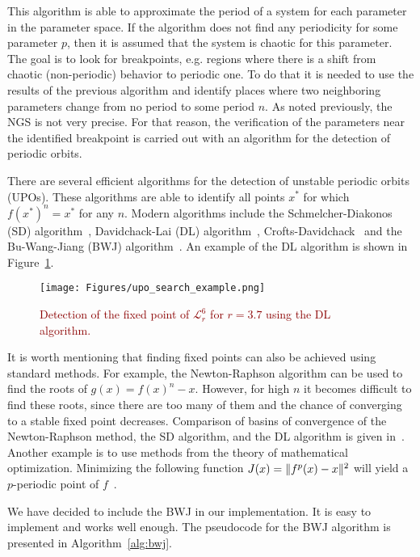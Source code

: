 This algorithm is able to approximate the period of a system for each parameter in the parameter space.
If the algorithm does not find any periodicity for some parameter $p$, then it is assumed that the system is chaotic for this parameter.
The goal is to look for breakpoints, e.g. regions where there is a shift from chaotic (non-periodic) behavior to periodic one.
To do that it is needed to use the results of the previous algorithm and identify places where two neighboring parameters change from no period to some period $n$.
As noted previously, the NGS is not very precise. For that reason, the verification of the parameters near the identified breakpoint is carried out with an algorithm for the detection of periodic orbits.
\par
There are several efficient algorithms for the detection of unstable periodic orbits (UPOs).
These algorithms are able to identify all points $x^{*}$ for which $f(x^{*})^{n}=x^{*}$ for any $n$.
Modern algorithms include the Schmelcher-Diakonos (SD) algorithm~\cite{Schmelcher1997,Pingel2000, Pingel2001}, Davidchack-Lai (DL) algorithm~\cite{Davidchack1999, Davidchack2001, Klebanoff2001}, Crofts-Davidchack~\cite{Crofts2005,Crofts2007,Crofts2008,Crofts20090901} and the Bu-Wang-Jiang (BWJ) algorithm~\cite{Bu2004}.
An example of the DL algorithm is shown in Figure~\ref{fig:upo_search_example}.

\begin{figure}[!h]
    \centering
    \texttt{[image: Figures/upo\_search\_example.png]}
    \caption{
        \textcolor{darkred}{
        Detection of the fixed point of $\mathcal{L}_{r}^{6}$ for $r = 3.7$ using the DL algorithm.
        }
    }
    \label{fig:upo_search_example}
\end{figure}

\par
It is worth mentioning that finding fixed points can also be achieved using standard methods.
For example, the Newton-Raphson algorithm can be used to find the roots of $g(x) = f(x)^{n} - x$.
However, for high $n$ it becomes difficult to find these roots, since there are too many of them and the chance of converging to a stable fixed point decreases.
Comparison of basins of convergence of the Newton-Raphson method, the SD algorithm, and the DL algorithm is given in~\cite{Davidchack1999}.
Another example is to use methods from the theory of mathematical optimization.
Minimizing the following function $J(x)= \lVert f^{p}(x)-x\rVert^{2}$ will yield a $p$-periodic point of $f$~\cite{Fuh2009}.
\par
We have decided to include the BWJ in our implementation.
It is easy to implement and works well enough.
The pseudocode for the BWJ algorithm is presented in Algorithm~\ref{alg:bwj}.

